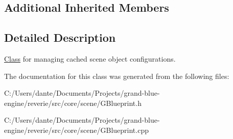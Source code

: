 \subsection*{Additional Inherited Members}


\subsection{Detailed Description}
\mbox{\hyperlink{struct_class}{Class}} for managing cached scene object configurations. 

The documentation for this class was generated from the following files\+:\begin{DoxyCompactItemize}
\item 
C\+:/\+Users/dante/\+Documents/\+Projects/grand-\/blue-\/engine/reverie/src/core/scene/G\+Blueprint.\+h\item 
C\+:/\+Users/dante/\+Documents/\+Projects/grand-\/blue-\/engine/reverie/src/core/scene/G\+Blueprint.\+cpp\end{DoxyCompactItemize}
